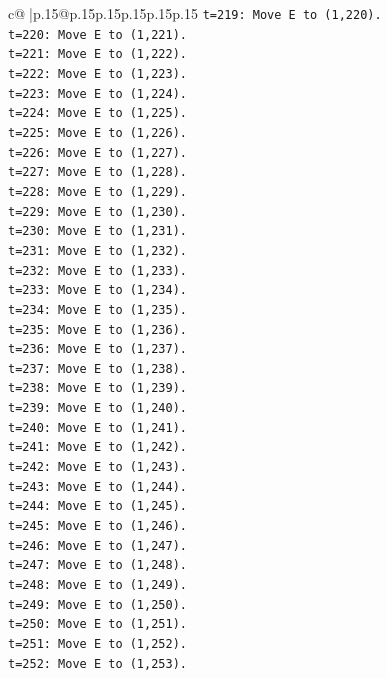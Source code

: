 \documentclass{article}
\begin{document}
{\begin{supertabular}{c@{$\;$}|p{.15\linewidth}@{}p{.15\linewidth}p{.15\linewidth}p{.15\linewidth}p{.15\linewidth}p{.15\linewidth}}
{{{\texttt{t=219: Move E to (1,220).} \\
\texttt{t=220: Move E to (1,221).} \\
\texttt{t=221: Move E to (1,222).} \\
\texttt{t=222: Move E to (1,223).} \\
\texttt{t=223: Move E to (1,224).} \\
\texttt{t=224: Move E to (1,225).} \\
\texttt{t=225: Move E to (1,226).} \\
\texttt{t=226: Move E to (1,227).} \\
\texttt{t=227: Move E to (1,228).} \\
\texttt{t=228: Move E to (1,229).} \\
\texttt{t=229: Move E to (1,230).} \\
\texttt{t=230: Move E to (1,231).} \\
\texttt{t=231: Move E to (1,232).} \\
\texttt{t=232: Move E to (1,233).} \\
\texttt{t=233: Move E to (1,234).} \\
\texttt{t=234: Move E to (1,235).} \\
\texttt{t=235: Move E to (1,236).} \\
\texttt{t=236: Move E to (1,237).} \\
\texttt{t=237: Move E to (1,238).} \\
\texttt{t=238: Move E to (1,239).} \\
\texttt{t=239: Move E to (1,240).} \\
\texttt{t=240: Move E to (1,241).} \\
\texttt{t=241: Move E to (1,242).} \\
\texttt{t=242: Move E to (1,243).} \\
\texttt{t=243: Move E to (1,244).} \\
\texttt{t=244: Move E to (1,245).} \\
\texttt{t=245: Move E to (1,246).} \\
\texttt{t=246: Move E to (1,247).} \\
\texttt{t=247: Move E to (1,248).} \\
\texttt{t=248: Move E to (1,249).} \\
\texttt{t=249: Move E to (1,250).} \\
\texttt{t=250: Move E to (1,251).} \\
\texttt{t=251: Move E to (1,252).} \\
\texttt{t=252: Move E to (1,253).} \\
}}}
\end{supertabular}}
\end{document}

